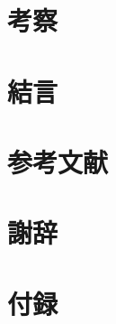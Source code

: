 \documentclass[a4j,12pt]{jsarticle}
\begin{document}
\section{考察}

\section{結言}

\section{参考文献}

\section{謝辞}

\section{付録}
\end{document}
